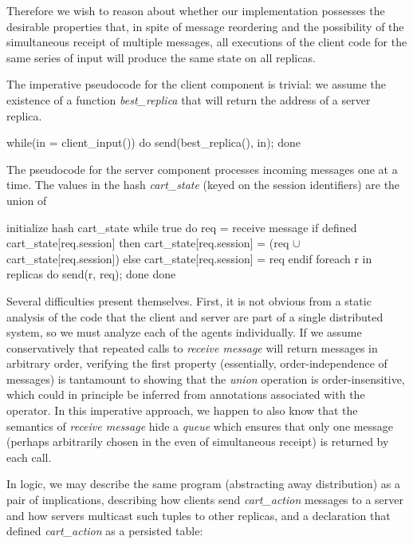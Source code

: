 Therefore we wish to reason about whether our implementation possesses the desirable 
properties that, in spite of message reordering and the possibility of the simultaneous
receipt of multiple messages, all executions of the client code for the same series of
input will produce the same state on all replicas.  

The imperative pseudocode for the client component is trivial: we assume the existence
of a function {\em best\_replica} that will return the address of a server replica.

\begin{Dedalus}
while(in = client_input()) do
  send(best_replica(), in);
done
\end{Dedalus}


The pseudocode for the server component processes incoming messages one
at a time.  The values in the hash {\em cart\_state} (keyed on the session identifiers) 
are the union of 

\begin{Dedalus}
initialize hash cart_state
while true do
  req = receive message
  if defined cart_state[req.session] then
     cart_state[req.session] =  
       (req \(\cup\) cart_state[req.session]) 
  else 
    cart_state[req.session] = { req } 
  endif
  foreach r in replicas do
    send(r, req);
  done
done
\end{Dedalus}


Several difficulties present themselves.
First, it is not obvious from a static analysis of the code that the client and server are
part of a single distributed system, so we must analyze each of the agents individually.
If we assume conservatively that repeated calls to {\em receive message} will return messages in
arbitrary order, verifying the first property (essentially, order-independence of messages)
is tantamount to showing that the {\em union} operation is
order-insensitive, which could in principle be inferred from annotations associated
with the operator.
In this imperative approach, we happen to also know that the semantics of {\em receive message}
hide a {\em queue} which ensures that only one message (perhaps arbitrarily chosen in the
even of simultaneous receipt) is returned by each call.


In logic, we may describe the same program (abstracting away distribution)
as a pair of implications, describing how clients send {\em cart\_action}
messages to a server and how servers multicast such tuples to other replicas, and 
a declaration that defined {\em cart\_action} as a persisted table:

